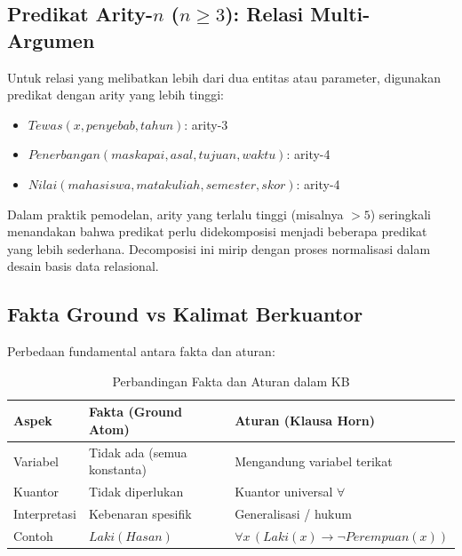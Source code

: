 \subsection{Predikat Arity-$n$ ($n \geq 3$): Relasi Multi-Argumen}

Untuk relasi yang melibatkan lebih dari dua entitas atau parameter, digunakan predikat dengan arity yang lebih tinggi:

\begin{itemize}
    \item $Tewas(x, penyebab, tahun)$: arity-3
    \item $Penerbangan(maskapai, asal, tujuan, waktu)$: arity-4
    \item $Nilai(mahasiswa, matakuliah, semester, skor)$: arity-4
\end{itemize}

\begin{catatan}
Dalam praktik pemodelan, arity yang terlalu tinggi (misalnya $> 5$) seringkali menandakan bahwa predikat perlu didekomposisi menjadi beberapa predikat yang lebih sederhana. Decomposisi ini mirip dengan proses normalisasi dalam desain basis data relasional.
\end{catatan}

\subsection{Fakta Ground vs Kalimat Berkuantor}

Perbedaan fundamental antara fakta dan aturan:

\begin{table}[htbp]
\centering
\renewcommand{\arraystretch}{1.3}
\begin{tabular}{|p{3.5cm}|p{4cm}|p{4.5cm}|}
\hline
\textbf{Aspek} & \textbf{Fakta (Ground Atom)} & \textbf{Aturan (Klausa Horn)} \\ \hline
Variabel & Tidak ada (semua konstanta) & Mengandung variabel terikat \\ \hline
Kuantor & Tidak diperlukan & Kuantor universal $\forall$ \\ \hline
Interpretasi & Kebenaran spesifik & Generalisasi / hukum \\ \hline
Contoh & $Laki(Hasan)$ & $\forall x\,(Laki(x) \rightarrow \neg Perempuan(x))$ \\ \hline
\end{tabular}
\caption{Perbandingan Fakta dan Aturan dalam KB}
\end{table}

